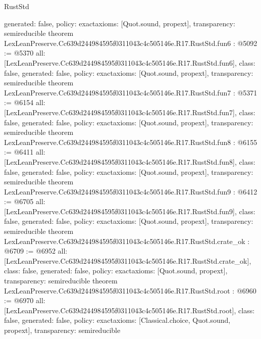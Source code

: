 \begin{lexlean}{RustStd}
\begin{coremodule}
{  generated: false,
  policy: exact{axioms: [Quot.sound, propext]},
  transparency: semireducible
}
theorem LexLeanPreserve.Cc639d244984595f0311043c4c505146e.R17.RustStd.fun6 : @5092 := @5370 {
  all: [LexLeanPreserve.Cc639d244984595f0311043c4c505146e.R17.RustStd.fun6],
  class: false,
  generated: false,
  policy: exact{axioms: [Quot.sound, propext]},
  transparency: semireducible
}
theorem LexLeanPreserve.Cc639d244984595f0311043c4c505146e.R17.RustStd.fun7 : @5371 := @6154 {
  all: [LexLeanPreserve.Cc639d244984595f0311043c4c505146e.R17.RustStd.fun7],
  class: false,
  generated: false,
  policy: exact{axioms: [Quot.sound, propext]},
  transparency: semireducible
}
theorem LexLeanPreserve.Cc639d244984595f0311043c4c505146e.R17.RustStd.fun8 : @6155 := @6411 {
  all: [LexLeanPreserve.Cc639d244984595f0311043c4c505146e.R17.RustStd.fun8],
  class: false,
  generated: false,
  policy: exact{axioms: [Quot.sound, propext]},
  transparency: semireducible
}
theorem LexLeanPreserve.Cc639d244984595f0311043c4c505146e.R17.RustStd.fun9 : @6412 := @6705 {
  all: [LexLeanPreserve.Cc639d244984595f0311043c4c505146e.R17.RustStd.fun9],
  class: false,
  generated: false,
  policy: exact{axioms: [Quot.sound, propext]},
  transparency: semireducible
}
theorem LexLeanPreserve.Cc639d244984595f0311043c4c505146e.R17.RustStd.crate_ok : @6709 := @6952 {
  all: [LexLeanPreserve.Cc639d244984595f0311043c4c505146e.R17.RustStd.crate_ok],
  class: false,
  generated: false,
  policy: exact{axioms: [Quot.sound, propext]},
  transparency: semireducible
}
theorem LexLeanPreserve.Cc639d244984595f0311043c4c505146e.R17.RustStd.root : @6960 := @6970 {
  all: [LexLeanPreserve.Cc639d244984595f0311043c4c505146e.R17.RustStd.root],
  class: false,
  generated: false,
  policy: exact{axioms: [Classical.choice, Quot.sound, propext]},
  transparency: semireducible
}


\end{coremodule}
\end{lexlean}
